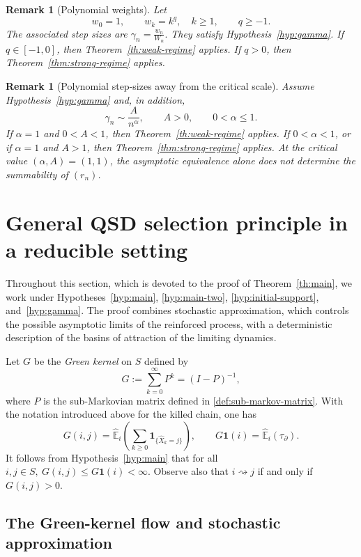 \documentclass[10pt,letterpaper]{article}
\theoremstyle{compactplain}
\theoremstyle{compactdefinition}
\newtheorem{remark}[theorem]{Remark}
\newcommand{\1}{\mathds{1}}
\begin{document}
\begin{remark}[Polynomial weights]
Let
\[
w_0=1,
\qquad
w_k=k^q,
\quad k\geq1,
\qquad q\geq-1.
\]
The associated step sizes are \(\gamma_n=\frac{w_n}{W_n}.\)
They satisfy Hypothesis~\ref{hyp:gamma}. If \(q\in[-1,0]\), then
Theorem~\ref{th:weak-regime} applies. If \(q>0\), then
Theorem~\ref{thm:strong-regime} applies.
\end{remark}






\begin{remark}[Polynomial step-sizes away from the critical scale]
Assume Hypothesis~\ref{hyp:gamma} and, in addition,
\[
\gamma_n\sim\frac{A}{n^\alpha},
\qquad
A>0,
\qquad
0<\alpha\leq1.
\]
If \(\alpha=1\) and \(0<A<1\), then
Theorem~\ref{th:weak-regime} applies. If \(0<\alpha<1\), or if
\(\alpha=1\) and \(A>1\), then Theorem~\ref{thm:strong-regime} applies.
At the critical value \((\alpha,A)=(1,1)\), the asymptotic equivalence alone
does not determine the summability of \((r_n)\).
\end{remark}



\section{General QSD selection principle in a reducible setting}
\label{sec:general-proof}

Throughout this section, which is devoted to the proof of Theorem~\ref{th:main}, we work under
Hypotheses~\ref{hyp:main}, \ref{hyp:main-two},
\ref{hyp:initial-support}, and~\ref{hyp:gamma}.
The proof combines stochastic approximation, which controls the possible
asymptotic limits of the reinforced process, with a deterministic description
of the basins of attraction of the limiting dynamics.
\medskip

Let \(G\) be the \emph{Green kernel} on \(S\) defined by
\[
G:=\sum_{k=0}^\infty P^k=(I-P)^{-1},
\]
where \(P\) is the sub-Markovian matrix defined in \eqref{def:sub-markov-matrix}. With the notation introduced above for the killed chain, one has
\[
G(i,j)
=
\widehat{\mathbb E}_i
\left(
\sum_{k\geq0}\mathbf 1_{\{\widehat X_k=j\}}
\right),
\qquad
G\mathbf 1(i)
=
\widehat{\mathbb E}_i(\tau_\partial).
\]
It follows from Hypothesis~\ref{hyp:main} that for all \(i,j\in S, \ G(i,j)\leq G\mathbf 1(i)<\infty\).
Observe also that $i\rightsquigarrow j$ if and only if $G(i,j)>0$.


\subsection{The Green-kernel flow and stochastic approximation}
\end{document}
